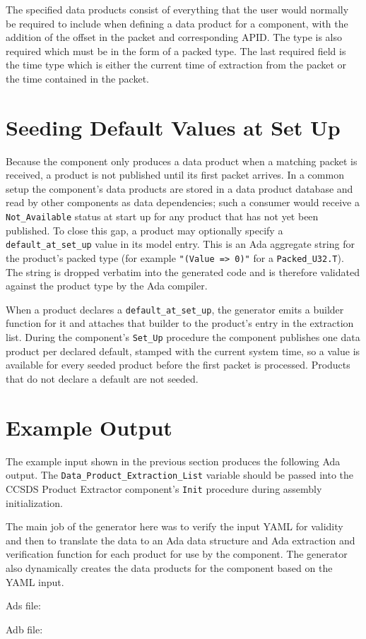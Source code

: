 
The specified data products consist of everything that the user would normally be required to include when defining a data product for a component, with the addition of the offset in the packet and corresponding APID. The type is also required which must be in the form of a packed type. The last required field is the time type which is either the current time of extraction from the packet or the time contained in the packet.

\section{Seeding Default Values at Set Up}

Because the component only produces a data product when a matching packet is received, a product is not published until its first packet arrives. In a common setup the component's data products are stored in a data product database and read by other components as data dependencies; such a consumer would receive a \texttt{Not\_Available} status at start up for any product that has not yet been published. To close this gap, a product may optionally specify a \texttt{default\_at\_set\_up} value in its model entry. This is an Ada aggregate string for the product's packed type (for example \texttt{"(Value => 0)"} for a \texttt{Packed\_U32.T}). The string is dropped verbatim into the generated code and is therefore validated against the product type by the Ada compiler.

When a product declares a \texttt{default\_at\_set\_up}, the generator emits a builder function for it and attaches that builder to the product's entry in the extraction list. During the component's \texttt{Set\_Up} procedure the component publishes one data product per declared default, stamped with the current system time, so a value is available for every seeded product before the first packet is processed. Products that do not declare a default are not seeded.

\section{Example Output}

The example input shown in the previous section produces the following Ada output. The
\texttt{Data\_Product\_Extraction\_List} variable should be passed into the CCSDS Product Extractor component's \texttt{Init} procedure during assembly initialization.

The main job of the generator here was to verify the input YAML for validity and then to translate the data to an Ada data structure and Ada extraction and verification function for each product for use by the component. The generator also dynamically creates the data products for the component based on the YAML input.

Ads file:

Adb file:


